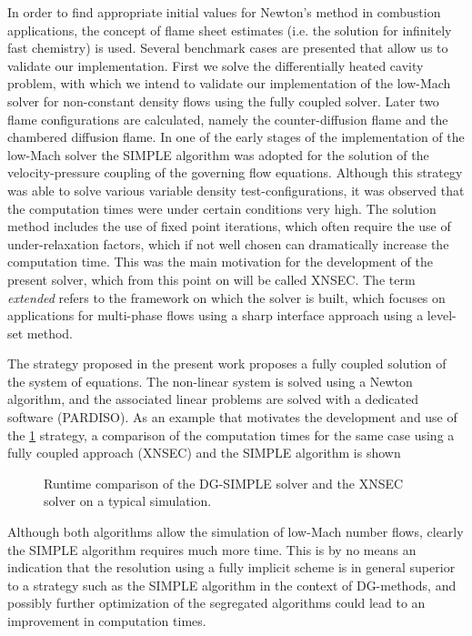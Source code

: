 In order to find appropriate initial values for Newton's method in combustion applications, the concept of flame sheet estimates (i.e. the solution for infinitely fast chemistry) is used. Several benchmark cases are presented that allow us to validate our implementation. First we solve the differentially heated cavity problem, with which we intend to validate our implementation of the low-Mach solver for non-constant density flows using the fully coupled solver. Later two flame configurations are calculated, namely the counter-diffusion flame and the chambered diffusion flame. \parencite{matalonDiffusionFlamesChamber1980}
In one of the early stages of the implementation of the low-Mach solver the SIMPLE algorithm was adopted for the solution of the velocity-pressure coupling of the governing flow equations. Although this strategy was able to solve various variable density test-configurations, it was observed that the computation times were under certain conditions very high. The solution method includes the use of fixed point iterations, which often require the use of under-relaxation factors, which if not well chosen can dramatically increase the computation time. This was the main motivation for the development of the present solver, which from this point on will be called \gls{XNSEC}. The term \textit{extended} refers to the framework on which the solver is built, which focuses on applications for multi-phase flows using a sharp interface approach using a level-set method. 

The strategy proposed in the present work proposes a fully coupled solution of the system of equations. The non-linear system is solved using a Newton algorithm, and the associated linear problems are solved with a dedicated software (PARDISO). As an example that motivates the development and use of the \cref{fig:RuntimeComparisonk2} strategy, a comparison of the computation times for the same case using a fully coupled approach (XNSEC) and the SIMPLE algorithm is shown 

\begin{figure}[h]	
	\centering
	\caption{Runtime comparison of the DG-SIMPLE solver and the XNSEC solver on a typical simulation.}
	\label{fig:RuntimeComparisonk2}
\end{figure}
Although both algorithms allow the simulation of low-Mach number flows, clearly the SIMPLE algorithm requires much more time. This is by no means an indication that the resolution using a fully implicit scheme is in general superior to a strategy such as the SIMPLE algorithm in the context of DG-methods, and possibly further optimization of the segregated algorithms could lead to an improvement in computation times.




